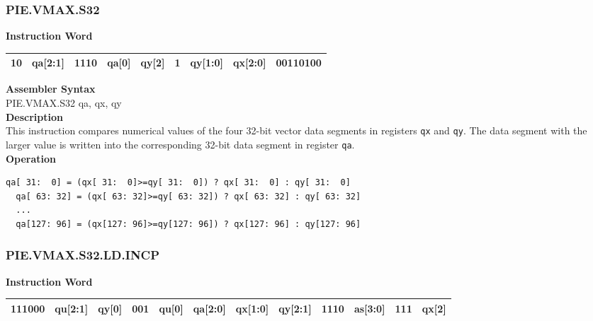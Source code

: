 \newpage
\subsubsection{PIE.VMAX.S32}\label{instruction:PIEVMAXS32}
\setlength\tabcolsep{6pt}
\textbf{Instruction Word} \\
\begin{tabular}{|c|c|c|c|c|c|c|c|c|}
	\hline
	10 & qa[2:1] & 1110 & qa[0] & qy[2] & 1 & qy[1:0] & qx[2:0] & 00110100 \\
	\hline
\end{tabular}

\textbf{Assembler Syntax} \\
PIE.VMAX.S32 qa, qx, qy \\
\textbf{Description} \\
This instruction compares numerical values of the four 32-bit vector data segments in registers \lstinline{qx} and \lstinline{qy}. The data segment with the larger value is written into the corresponding 32-bit data segment in register \lstinline{qa}.\\
\textbf{Operation}
\begin{lstlisting}[escapeinside=`?]
  qa[ 31:  0] = (qx[ 31:  0]>=qy[ 31:  0]) ? qx[ 31:  0] : qy[ 31:  0]
  qa[ 63: 32] = (qx[ 63: 32]>=qy[ 63: 32]) ? qx[ 63: 32] : qy[ 63: 32]
  ...
  qa[127: 96] = (qx[127: 96]>=qy[127: 96]) ? qx[127: 96] : qy[127: 96]
\end{lstlisting}

\newpage
\subsubsection{PIE.VMAX.S32.LD.INCP}\label{instruction:PIEVMAXS32LDINCP}
\setlength\tabcolsep{6pt}
\textbf{Instruction Word} \\
\begin{tabular}{|c|c|c|c|c|c|c|c|c|c|c|c|}
	\hline
	111000 & qu[2:1] & qy[0] & 001 & qu[0] & qa[2:0] & qx[1:0] & qy[2:1] & 1110 & as[3:0] & 111 & qx[2] \\
	\hline
\end{tabular}

